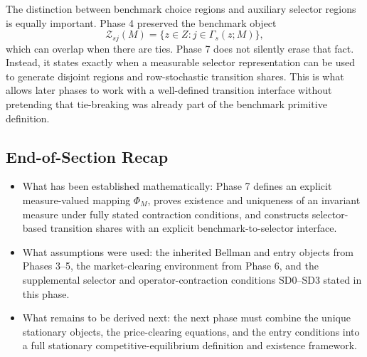 The distinction between benchmark choice regions and auxiliary selector regions is equally important. Phase 4 preserved the benchmark object
\[
\mathcal Z_{sj}(M)=\{z\in Z:j\in\Gamma_s(z;M)\},
\]
which can overlap when there are ties. Phase 7 does not silently erase that fact. Instead, it states exactly when a measurable selector representation can be used to generate disjoint regions and row-stochastic transition shares. This is what allows later phases to work with a well-defined transition interface without pretending that tie-breaking was already part of the benchmark primitive definition.

\subsection*{End-of-Section Recap}

\begin{itemize}
    \item What has been established mathematically: Phase 7 defines an explicit measure-valued mapping $\Phi_M$, proves existence and uniqueness of an invariant measure under fully stated contraction conditions, and constructs selector-based transition shares with an explicit benchmark-to-selector interface.
    \item What assumptions were used: the inherited Bellman and entry objects from Phases 3--5, the market-clearing environment from Phase 6, and the supplemental selector and operator-contraction conditions SD0--SD3 stated in this phase.
    \item What remains to be derived next: the next phase must combine the unique stationary objects, the price-clearing equations, and the entry conditions into a full stationary competitive-equilibrium definition and existence framework.
\end{itemize}
